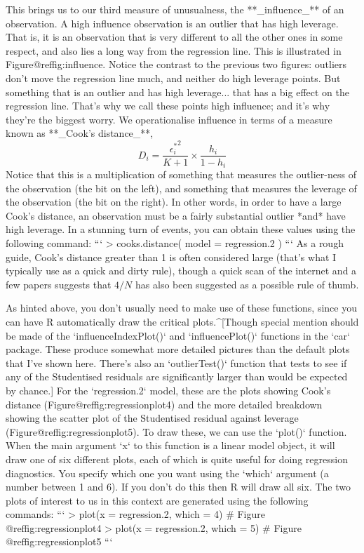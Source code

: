 This brings us to our third measure of unusualness, the **_influence_** of an observation. A high influence observation is an outlier that has high leverage. That is, it is an observation that is very different to all the other ones in some respect, and also lies a long way from the regression line. This is illustrated in Figure@reffig:influence. Notice the contrast to the previous two figures: outliers don't move the regression line much, and neither do high leverage points. But something that is an outlier and has high leverage... that has a big effect on the regression line. That's why we call these points high influence; and it's why they're the biggest worry. We operationalise influence in terms of a measure known as **_Cook's distance_**, 
$$
D_i = \frac{{\epsilon_i^*}^2 }{K+1} \times \frac{h_i}{1-h_i}
$$ 
Notice that this is a multiplication of something that measures the outlier-ness of the observation (the bit on the left), and something that measures the leverage of the observation (the bit on the right). In other words, in order to have a large Cook's distance, an observation must be a fairly substantial outlier *and* have high leverage. In a stunning turn of events, you can obtain these values using the following command:
```
> cooks.distance( model = regression.2 )
```
As a rough guide, Cook's distance greater than 1 is often considered large (that's what I typically use as a quick and dirty rule), though a quick scan of the internet and a few papers suggests that $4/N$ has also been suggested as a possible rule of thumb. 

As hinted above, you don't usually need to make use of these functions, since you can have R automatically draw the critical plots.^[Though special mention should be made of the `influenceIndexPlot()` and `influencePlot()` functions in the `car` package. These produce somewhat more detailed pictures than the default plots that I've shown here. There's also an `outlierTest()` function that tests to see if any of the Studentised residuals are significantly larger than would  be expected by chance.] For the `regression.2` model, these are the plots showing Cook's distance (Figure@reffig:regressionplot4) and the more detailed breakdown showing the scatter plot of the Studentised residual against leverage (Figure@reffig:regressionplot5). To draw these, we can use the `plot()` function. When the main argument `x` to this function is a linear model object, it will draw one of six different plots, each of which is quite useful for doing regression diagnostics. You specify which one you want using the `which` argument (a number between 1 and 6). If you don't do this then R will draw all six. The two plots of interest to us in this context are generated using the following commands:
```
> plot(x = regression.2, which = 4)  # Figure @ref{fig:regressionplot4}
> plot(x = regression.2, which = 5)  # Figure @ref{fig:regressionplot5}
```

